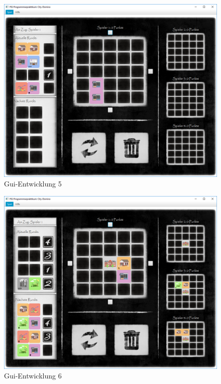 \begin{figure}
	\centering
	\includegraphics{anhang/pics/290918}
	\caption{Gui-Entwicklung 5}
	\label{fig:guiEnwicklung5}
\end{figure}

\begin{figure}
	\centering
	\includegraphics{anhang/pics/Main121018}
	\caption{Gui-Entwicklung 6}
	\label{fig:guiEnwicklung6}
\end{figure}

